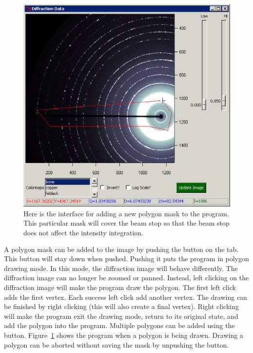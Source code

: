 \begin{figure}
    \centering
    \includegraphics[scale=.75]{figures/Adding_Polygon.eps}
    \caption{Here is the interface for adding a new polygon 
    mask to the program. This particular mask will cover 
    the beam stop so that the beam stop does not affect
    the intensity integration.}
    \label{Adding_Polygon}
\end{figure}

A polygon mask can be added to the image by pushing
the  button on the  tab. 
This button will stay down when pushed.  Pushing it puts 
the program in polygon drawing mode.  In this mode, the 
diffraction image will behave differently. The diffraction
image can no longer be zoomed or panned.
Instead, left clicking on the diffraction image will make
the program draw the polygon.  The first left click adds the
first vertex. Each success left click add another vertex. 
The drawing can be finished by right clicking (this will
also create a final vertex). Right clicking will make
the program exit the drawing mode, return to its
original state, and add the polygon into the program. 
Multiple polygons can be added using the 
button. Figure~\ref{Adding_Polygon} shows 
the program when a polygon is
being drawn. Drawing a polygon can be aborted without
saving the mask by unpushing the  button.

